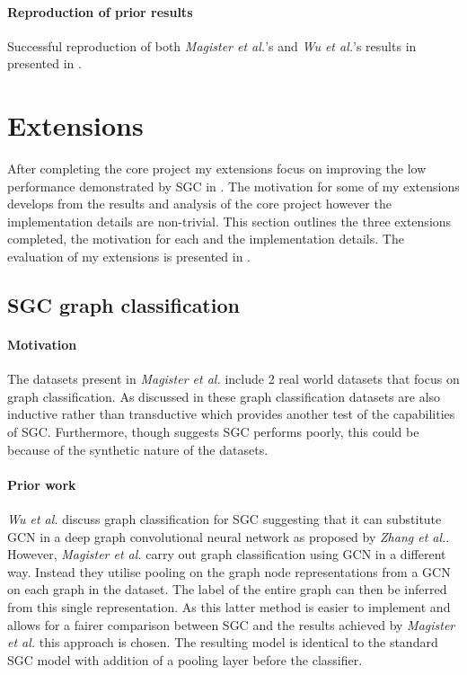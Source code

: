 \paragraph{Reproduction of prior results}
Successful reproduction of both \textit{Magister et al.}\cite{magister2021gcexplainer}'s and \textit{Wu et al.}\cite{wu2019simplifying}'s results in presented in .

\section{Extensions}
After completing the core project my extensions focus on improving the low performance demonstrated by SGC in .
The motivation for some of my extensions develops from the results and analysis of the core project however the implementation details are non-trivial.
This section outlines the three extensions completed, the motivation for each and the implementation details.
The evaluation of my extensions is presented in .

\subsection{SGC graph classification}
\paragraph{Motivation}
The datasets present in \textit{Magister et al.}\cite{magister2021gcexplainer} include 2 real world datasets that focus on graph classification.
As discussed in  these graph classification datasets are also inductive rather than transductive which provides another test of the capabilities of SGC.
Furthermore, though  suggests SGC performs poorly, this could be because of the synthetic nature of the datasets.

\paragraph{Prior work}
\textit{Wu et al.}\cite{wu2019simplifying} discuss graph classification for SGC suggesting that it can substitute GCN in a deep graph convolutional neural network as proposed by \textit{Zhang et al.}\cite{zhang2018end}.
However, \textit{Magister et al.} carry out graph classification using GCN in a different way.
Instead they utilise pooling on the graph node representations from a GCN on each graph in the dataset.
The label of the entire graph can then be inferred from this single representation.
As this latter method is easier to implement and allows for a fairer comparison between SGC and the results achieved by \textit{Magister et al.} this approach is chosen.
The resulting model is identical to the standard SGC model with addition of a pooling layer before the classifier.

